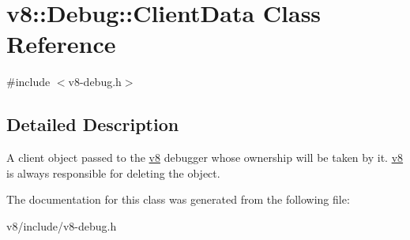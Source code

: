 \hypertarget{classv8_1_1Debug_1_1ClientData}{\section{v8\-:\-:Debug\-:\-:Client\-Data Class Reference}
\label{classv8_1_1Debug_1_1ClientData}
}


{\ttfamily \#include $<$v8-\/debug.\-h$>$}



\subsection{Detailed Description}
A client object passed to the \hyperlink{namespacev8}{v8} debugger whose ownership will be taken by it. \hyperlink{namespacev8}{v8} is always responsible for deleting the object. 

The documentation for this class was generated from the following file\-:\begin{DoxyCompactItemize}
\item 
v8/include/v8-\/debug.\-h\end{DoxyCompactItemize}
